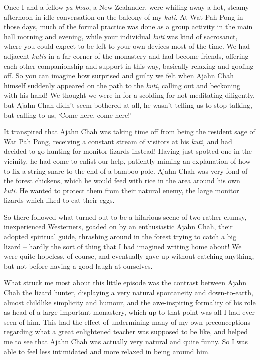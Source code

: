 Once I and a fellow \emph{pa-khao}, a New Zealander, were whiling away a
hot, steamy afternoon in idle conversation on the balcony of my
\emph{kuti}. At Wat Pah Pong in those days, much of the formal practice
was done as a group activity in the main hall morning and evening, while
your individual \emph{kuti} was kind of sacrosanct, where you could
expect to be left to your own devices most of the time. We had adjacent
\emph{kutis} in a far corner of the monastery and had become friends,
offering each other companionship and support in this way, basically
relaxing and goofing off. So you can imagine how surprised and guilty we
felt when Ajahn Chah himself suddenly appeared on the path to the
\emph{kuti}, calling out and beckoning with his hand! We thought we were
in for a scolding for not meditating diligently, but Ajahn Chah didn't
seem bothered at all, he wasn't telling us to stop talking, but calling
to us, `Come here, come here!'

It transpired that Ajahn Chah was taking time off from being the
resident sage of Wat Pah Pong, receiving a constant stream of visitors
at his \emph{kuti,} and had decided to go hunting for monitor lizards
instead! Having just spotted one in the vicinity, he had come to enlist
our help, patiently miming an explanation of how to fix a string snare
to the end of a bamboo pole. Ajahn Chah was very fond of the forest
chickens, which he would feed with rice in the area around his own
\emph{kuti}. He wanted to protect them from their natural enemy, the
large monitor lizards which liked to eat their eggs.

So there followed what turned out to be a hilarious scene of two rather
clumsy, inexperienced Westerners, goaded on by an enthusiastic Ajahn
Chah, their adopted spiritual guide, thrashing around in the forest
trying to catch a big lizard -- hardly the sort of thing that I had
imagined writing home about! We were quite hopeless, of course, and
eventually gave up without catching anything, but not before having a
good laugh at ourselves.

What struck me most about this little episode was the contrast between
Ajahn Chah the lizard hunter, displaying a very natural spontaneity and
down-to-earth, almost childlike simplicity and humour, and the
awe-inspiring formality of his role as head of a large important
monastery, which up to that point was all I had ever seen of him. This
had the effect of undermining many of my own preconceptions regarding
what a great enlightened teacher was supposed to be like, and helped me
to see that Ajahn Chah was actually very natural and quite funny. So I
was able to feel less intimidated and more relaxed in being around him.

